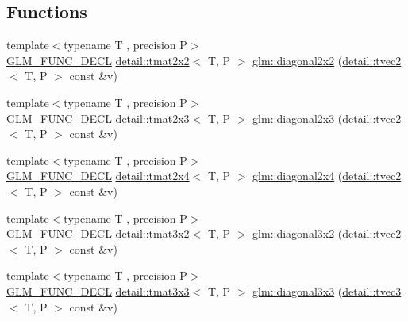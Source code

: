 \subsection*{Functions}
\begin{DoxyCompactItemize}
\item 
{\footnotesize template$<$typename T , precision P$>$ }\\\hyperlink{setup_8hpp_ab2d052de21a70539923e9bcbf6e83a51}{G\+L\+M\+\_\+\+F\+U\+N\+C\+\_\+\+D\+E\+CL} \hyperlink{structglm_1_1detail_1_1tmat2x2}{detail\+::tmat2x2}$<$ T, P $>$ \hyperlink{group__gtx__matrix__operation_gae4177a43a89e6b4b7352f82198f2ea84}{glm\+::diagonal2x2} (\hyperlink{structglm_1_1detail_1_1tvec2}{detail\+::tvec2}$<$ T, P $>$ const \&v)
\item 
{\footnotesize template$<$typename T , precision P$>$ }\\\hyperlink{setup_8hpp_ab2d052de21a70539923e9bcbf6e83a51}{G\+L\+M\+\_\+\+F\+U\+N\+C\+\_\+\+D\+E\+CL} \hyperlink{structglm_1_1detail_1_1tmat2x3}{detail\+::tmat2x3}$<$ T, P $>$ \hyperlink{group__gtx__matrix__operation_ga873468c41cb29fb84a12a866549e0136}{glm\+::diagonal2x3} (\hyperlink{structglm_1_1detail_1_1tvec2}{detail\+::tvec2}$<$ T, P $>$ const \&v)
\item 
{\footnotesize template$<$typename T , precision P$>$ }\\\hyperlink{setup_8hpp_ab2d052de21a70539923e9bcbf6e83a51}{G\+L\+M\+\_\+\+F\+U\+N\+C\+\_\+\+D\+E\+CL} \hyperlink{structglm_1_1detail_1_1tmat2x4}{detail\+::tmat2x4}$<$ T, P $>$ \hyperlink{group__gtx__matrix__operation_gaf97e094855cc3c6186b879d045f67aca}{glm\+::diagonal2x4} (\hyperlink{structglm_1_1detail_1_1tvec2}{detail\+::tvec2}$<$ T, P $>$ const \&v)
\item 
{\footnotesize template$<$typename T , precision P$>$ }\\\hyperlink{setup_8hpp_ab2d052de21a70539923e9bcbf6e83a51}{G\+L\+M\+\_\+\+F\+U\+N\+C\+\_\+\+D\+E\+CL} \hyperlink{structglm_1_1detail_1_1tmat3x2}{detail\+::tmat3x2}$<$ T, P $>$ \hyperlink{group__gtx__matrix__operation_gabf8e8445e2884aeaa35f0ec32ba5bd01}{glm\+::diagonal3x2} (\hyperlink{structglm_1_1detail_1_1tvec2}{detail\+::tvec2}$<$ T, P $>$ const \&v)
\item 
{\footnotesize template$<$typename T , precision P$>$ }\\\hyperlink{setup_8hpp_ab2d052de21a70539923e9bcbf6e83a51}{G\+L\+M\+\_\+\+F\+U\+N\+C\+\_\+\+D\+E\+CL} \hyperlink{structglm_1_1detail_1_1tmat3x3}{detail\+::tmat3x3}$<$ T, P $>$ \hyperlink{group__gtx__matrix__operation_gaa49be0f424ad2f3015c5945c13a5fad0}{glm\+::diagonal3x3} (\hyperlink{structglm_1_1detail_1_1tvec3}{detail\+::tvec3}$<$ T, P $>$ const \&v)

\end{DoxyCompactItemize}
